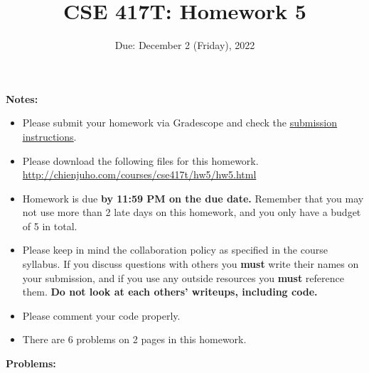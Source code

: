 \documentclass[11pt]{article}
\begin{document}
\title{CSE 417T: Homework 5}
\date{Due: December 2 (Friday), 2022}

\maketitle


\noindent \textbf{Notes: } 
\begin{itemize}

\item Please submit your homework via Gradescope and check the \href{http://chienjuho.com/courses/cse417t/hw_instructions.html}{\underline{submission instructions}}.

\item Please download the following files for this homework.\\
    \url{http://chienjuho.com/courses/cse417t/hw5/hw5.html}

\item Homework is due \textbf{by 11:59 PM on the due date.} Remember that
  you may not use more than 2 late days on this homework, and you
  only have a budget of 5 in total.

\item Please keep in mind the collaboration policy as specified in the
  course syllabus. If you discuss questions with 
others you \textbf{must} write their names on your submission, and if
you use any outside resources you \textbf{must} reference
them. \textbf{Do not look at each others' writeups, including code.}

\item Please comment your code properly.

\item There are 6 problems on 2 pages in this homework. 

\end{itemize}

\noindent \textbf{Problems:}
\end{document}
